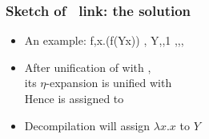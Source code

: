 \documentclass{pres}
\begin{document}
\begin{frame}[fragile]
  \frametitle{Sketch of \maybeeta\ link: the solution}

  \def\var{Y}

  \begin{itemize}
    \item An example: %
      \printAlllSingle
        {{{f,\lambda x.(f\appsep (\var\appsep x))}}}
        {{{,}}}
        {{{\var,,1}}}
        {{{,,,}}}
    \item After unification of  with ,\\
          its $\eta$-expansion is unified with \\
          Hence  is assigned to 
    \item Decompilation will assign $\lambda x.x$ to $\var$
    \end{itemize}

\end{frame}




\end{document}
